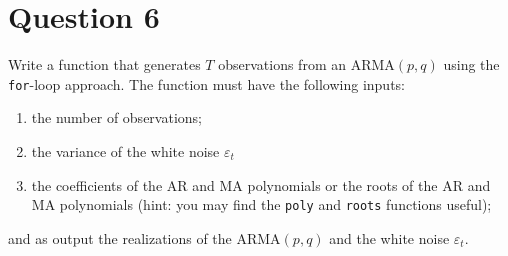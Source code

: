 \documentclass[dvipsnames,11pt]{article}
\begin{document}
\section*{Question 6}
\setcounter{section}{6}

    Write a function that generates $T$ observations from an ARMA$(p,q)$ using the \texttt{for}-loop approach. The function must have the following inputs: 

    \begin{enumerate}[label=(\roman*)]
        \item the number of observations;
        \item the variance of the white noise $\varepsilon_t$
        \item the coefficients of the AR and MA polynomials or the roots of the AR and MA polynomials (hint: you may find the \texttt{poly} and \texttt{roots} functions useful);
    \end{enumerate}
    
    and as output the realizations of the ARMA$(p,q)$ and the white noise $\varepsilon_t$.
\end{document}
